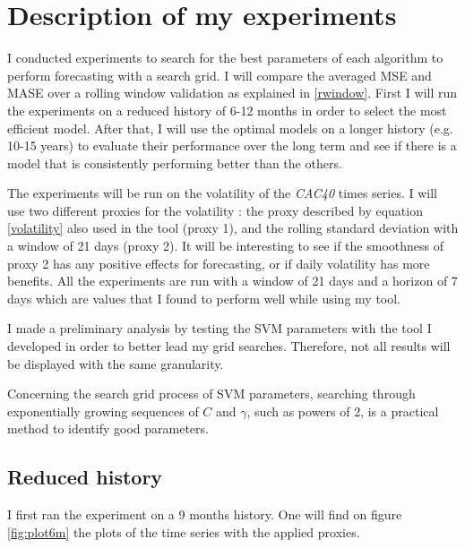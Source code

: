 \documentclass[11pt,a4paper,oneside]{book}
\begin{document}
\section{Description of my experiments}

I conducted experiments to search for the best parameters of each algorithm to perform forecasting with a search grid. I will compare the averaged MSE and MASE over a rolling window validation as explained in \ref{rwindow}. First I will run the experiments on a reduced history of 6-12 months in order to select the most efficient model. After that, I will use the optimal models on a longer history (e.g. 10-15 years) to evaluate their performance over the long term and see if there is a model that is consistently performing better than the others. 

The experiments will be run on the volatility of the \textit{CAC40} times series. I will use two different proxies for the volatility : the proxy described by equation \ref{volatility} also used in the tool (proxy 1), and the rolling standard deviation with a window of 21 days (proxy 2). It will be interesting to see if the smoothness of proxy 2 has any positive effects for forecasting, or if daily volatility has more benefits. All the experiments are run with a window of 21 days and a horizon of 7 days which are values that I found to perform well while using my tool.

I made a preliminary analysis by testing the SVM parameters with the tool I developed in order to better lead my grid searches. Therefore, not all results will be displayed with the same granularity.

Concerning the search grid process of SVM parameters, searching through exponentially growing sequences of $C$ and $\gamma$, such as powers of 2, is a practical method to identify good parameters. \cite{Hsu}


\subsection{Reduced history}

I first ran the experiment on a 9 months history. One will find on figure \ref{fig:plot6m} the plots of the time series with the applied proxies.
\end{document}

